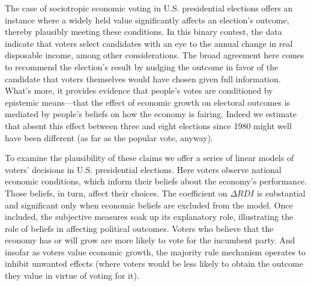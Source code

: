 \documentclass[11pt]{article}
\begin{document}
The case of sociotropic economic voting in U.S. presidential elections offers an instance where a widely held value significantly affects an election's outcome, thereby plausibly meeting these conditions. In this binary contest, the data indicate that voters select candidates with an eye to the annual change in real disposable income, among other considerations. The broad agreement here comes to recommend the election's result by nudging the outcome in favor of the candidate that voters themselves would have chosen given full information. What's more, it provides evidence that people's votes are conditioned by epistemic means---that the effect of economic growth on electoral outcomes is mediated by people's beliefs on how the economy is fairing. Indeed we estimate that absent this effect between three and eight elections since 1980 might well have been different (as far as the popular vote, anyway).


To examine the plausibility of these claims we offer a series of linear models of voters' decisions in U.S. presidential elections. Here voters observe national economic conditions, which inform their beliefs about the economy's performance. Those beliefs, in turn, affect their choices. The coefficient on $\Delta RDI$  is substantial and significant only when economic beliefs are excluded from the model. Once included, the subjective measures soak up its explanatory role, illustrating the role of beliefs in affecting political outcomes. Voters who believe that the economy has or will grow are more likely to vote for the incumbent party. And insofar as voters value economic growth, the majority rule mechanism operates to inhibit unwanted effects (where voters would be less likely to obtain the outcome they value in virtue of voting for it).
\end{document}

